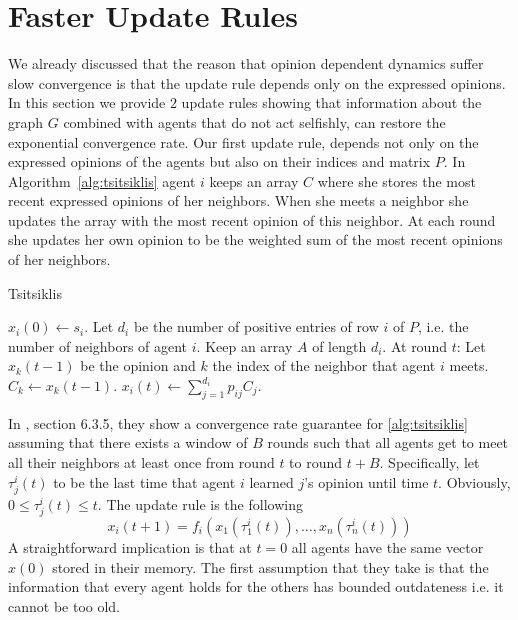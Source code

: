 \section{Faster Update Rules}\label{s:graph_aware}

We already discussed that the reason that opinion dependent dynamics suffer slow
convergence is that the update rule depends only on the expressed opinions.
In this section we provide $2$ update rules showing that information about the
graph $G$ combined with agents that do not act selfishly,
can restore the exponential convergence rate.
Our first update rule, depends not only on the expressed opinions of the
agents but also on their indices and matrix $P$.
In Algorithm~\ref{alg:tsitsiklis} agent $i$
keeps an array $C$ where she stores the most recent expressed opinions of
her neighbors.  When she meets a neighbor she updates the array with the
most recent opinion of this neighbor.
At each round she updates her own opinion to be the weighted sum of the
most recent opinions of her neighbors.
\begin{algorithm}
  \caption{Tsitsiklis}
  \label{alg:tsitsiklis}
  \begin{algorithmic}[1]
    \STATE $x_i(0) \gets s_i$.
    \STATE Let $d_i$ be the number of positive entries of row $i$ of $P$,
    i.e. the number of neighbors of agent $i$.
    \STATE Keep an array $A$ of length $d_i$.
    \STATE At round $t$:
    \bindent
    \STATE Let $x_k(t-1)$ be the opinion and $k$ the index of
    the neighbor that agent $i$ meets.
    \STATE $C_k \gets x_k(t-1)$.
    \STATE $x_i(t) \gets \sum_{j=1}^{d_i} p_{ij} C_j$.
    \eindent
\end{algorithmic}
\end{algorithm}
In \cite{BT97}, section 6.3.5, they show a convergence rate guarantee for
\ref{alg:tsitsiklis} assuming that there exists
a window of $B$ rounds such that all agents get to meet all their
neighbors at least once from round $t$ to round $t+B$.
Specifically, let $\tau_j^i(t)$ to be the last time that agent $i$
learned $j$'s opinion until time $t$. Obviously, $0\leq \tau_j^i(t) \leq t$.
The update rule is the following
\begin{equation}\label{eq:rule}
x_i(t+1) = f_i(x_1(\tau_1^i(t)),\ldots, x_n(\tau_n^i(t)))
\end{equation}
A straightforward implication is that at $t =0$ all agents have the same 
vector $x(0)$ stored in their memory. 
The first assumption that they take is that the information that every agent
holds for the others has bounded outdateness i.e. it cannot be too old. 
